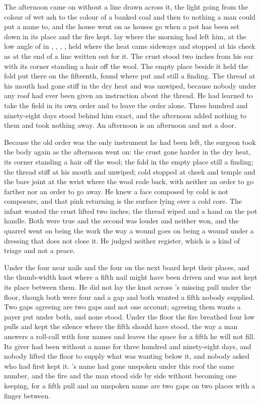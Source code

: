 The afternoon came on without a line drawn across it, the light going from the colour of wet ash to the colour of a banked coal and then to nothing a man could put a name to, and the house went on as houses go when a pot has been set down in its place and the fire kept.  lay where the morning had left him, at the low angle of  in , , , , held where the heat came sideways and stopped at his cheek as at the end of a line written out for it. The crust stood two inches from his ear with its corner standing a hair off the wool. The empty place beside it held the fold put there on the fifteenth, found where put and still a finding. The thread at his mouth had gone stiff in the dry heat and was unwiped, because nobody under any roof had ever been given an instruction about the thread. He had learned to take the field in its own order and to leave the order alone. Three hundred and ninety-eight days stood behind him exact, and the afternoon added nothing to them and took nothing away. An afternoon is an afternoon and not a door.

Because the old order was the only instrument he had been left, the surgeon took the body again as the afternoon went on: the crust gone harder in the dry heat, its corner standing a hair off the wool; the fold in the empty place still a finding; the thread stiff at his mouth and unwiped; cold stopped at cheek and temple and the bare joint at the wrist where the wool rode back, with neither an order to go farther nor an order to go away. He knew a face composed by cold is not composure, and that pink returning is the surface lying over a cold core. The infant wanted the crust lifted two inches, the thread wiped and a hand on the pot handle. Both were true and the second was louder and neither won, and the quarrel went on being the work the way a wound goes on being a wound under a dressing that does not close it. He judged neither register, which is a kind of triage and not a peace.

Under  the four near nails and the four on the next board kept their places, and the thumb-width knot where a fifth nail might have been driven and was not kept its place between them. He did not lay the knot across 's missing pull under the floor, though both were four and a gap and both wanted a fifth nobody supplied. Two gaps agreeing are two gaps and not one account; agreeing them wants a payer put under both, and none stood. Under the floor the fire breathed four low pulls and kept the silence where the fifth should have stood, the way a man answers a roll-call with four names and leaves the space for a fifth he will not fill. Its giver had been without a name for three hundred and ninety-eight days, and nobody lifted the floor to supply what was wanting below it, and nobody asked who had first kept it. 's name had gone unspoken under this roof the same number, and the fire and the man stood side by side without becoming one keeping, for a fifth pull and an unspoken name are two gaps on two places with a finger between.

